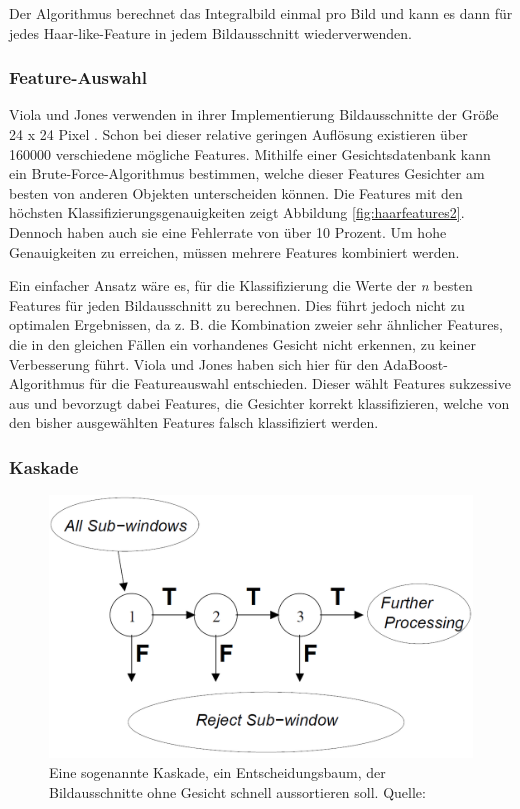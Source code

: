 \documentclass[doktyp=semarbeit, sprache=german]{TUBAFarbeiten}
\begin{document}
Der Algorithmus berechnet das Integralbild einmal pro Bild und kann es dann für jedes Haar-like-Feature in jedem Bildausschnitt wiederverwenden.

\subsubsection{Feature-Auswahl}
Viola und Jones verwenden in ihrer Implementierung Bildausschnitte der Größe 24 x 24 Pixel \cite{Viola01rapidobject}. Schon bei dieser relative geringen Auflösung existieren über 160000 verschiedene mögliche Features. Mithilfe einer Gesichtsdatenbank kann ein Brute-Force-Algorithmus bestimmen, welche dieser Features Gesichter am besten von anderen Objekten unterscheiden können. Die Features mit den höchsten Klassifizierungsgenauigkeiten zeigt Abbildung \ref{fig:haarfeatures2}. Dennoch haben auch sie eine Fehlerrate von über 10 Prozent. Um hohe Genauigkeiten zu erreichen, müssen mehrere Features kombiniert werden.

Ein einfacher Ansatz wäre es, für die Klassifizierung die Werte der \textit{n} besten Features für jeden Bildausschnitt zu berechnen. Dies führt jedoch nicht zu optimalen Ergebnissen, da z. B. die Kombination zweier sehr ähnlicher Features, die in den gleichen Fällen ein vorhandenes Gesicht nicht erkennen, zu keiner Verbesserung führt. Viola und Jones haben sich hier für den AdaBoost-Algorithmus für die Featureauswahl entschieden. Dieser wählt Features sukzessive aus und bevorzugt dabei Features, die Gesichter korrekt klassifizieren, welche von den bisher ausgewählten Features falsch klassifiziert werden.

\subsubsection{Kaskade}
\begin{figure}
	\centering
	\includegraphics[width=0.7\linewidth]{images/cascade}
	\caption[Kaskade]{Eine sogenannte Kaskade, ein Entscheidungsbaum, der Bildausschnitte ohne Gesicht schnell aussortieren soll. Quelle: \cite{Viola01rapidobject}}
	\label{fig:cascade}
\end{figure}
\end{document}
